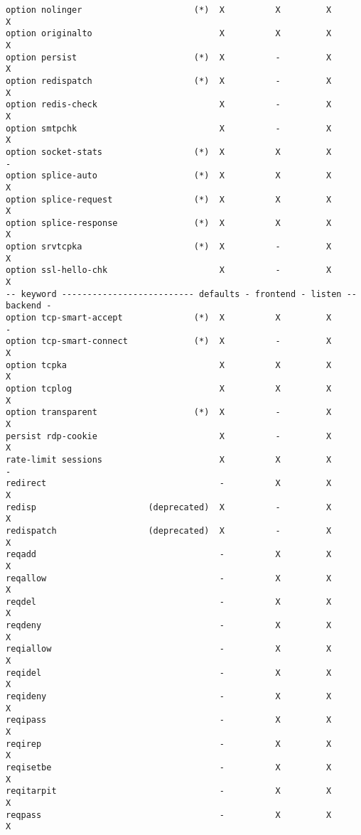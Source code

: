 \begin{verbatim}
option nolinger                      (*)  X          X         X         X
option originalto                         X          X         X         X
option persist                       (*)  X          -         X         X
option redispatch                    (*)  X          -         X         X
option redis-check                        X          -         X         X
option smtpchk                            X          -         X         X
option socket-stats                  (*)  X          X         X         -
option splice-auto                   (*)  X          X         X         X
option splice-request                (*)  X          X         X         X
option splice-response               (*)  X          X         X         X
option srvtcpka                      (*)  X          -         X         X
option ssl-hello-chk                      X          -         X         X
-- keyword -------------------------- defaults - frontend - listen -- backend -
option tcp-smart-accept              (*)  X          X         X         -
option tcp-smart-connect             (*)  X          -         X         X
option tcpka                              X          X         X         X
option tcplog                             X          X         X         X
option transparent                   (*)  X          -         X         X
persist rdp-cookie                        X          -         X         X
rate-limit sessions                       X          X         X         -
redirect                                  -          X         X         X
redisp                      (deprecated)  X          -         X         X
redispatch                  (deprecated)  X          -         X         X
reqadd                                    -          X         X         X
reqallow                                  -          X         X         X
reqdel                                    -          X         X         X
reqdeny                                   -          X         X         X
reqiallow                                 -          X         X         X
reqidel                                   -          X         X         X
reqideny                                  -          X         X         X
reqipass                                  -          X         X         X
reqirep                                   -          X         X         X
reqisetbe                                 -          X         X         X
reqitarpit                                -          X         X         X
reqpass                                   -          X         X         X

\end{verbatim}
